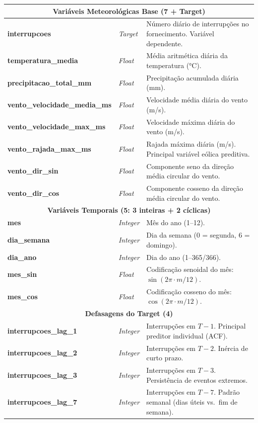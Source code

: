 \begin{center}
\begin{longtable}{p{6cm} p{1.2cm} p{5.8cm}}
\multicolumn{3}{c}{\textbf{Variáveis Meteorológicas Base (7 + Target)}} \\
\midrule
\textbf{interrupcoes} & \textit{Target} & Número diário de interrupções no fornecimento. Variável dependente. \\
\textbf{temperatura\_media} & \textit{Float} & Média aritmética diária da temperatura (°C). \\
\textbf{precipitacao\_total\_mm} & \textit{Float} & Precipitação acumulada diária (mm). \\
\textbf{vento\_velocidade\_media\_ms} & \textit{Float} & Velocidade média diária do vento (m/s). \\
\textbf{vento\_velocidade\_max\_ms} & \textit{Float} & Velocidade máxima diária do vento (m/s). \\
\textbf{vento\_rajada\_max\_ms} & \textit{Float} & Rajada máxima diária (m/s). Principal variável eólica preditiva. \\
\textbf{vento\_dir\_sin} & \textit{Float} & Componente seno da direção média circular do vento. \\
\textbf{vento\_dir\_cos} & \textit{Float} & Componente cosseno da direção média circular do vento. \\
\midrule
\multicolumn{3}{c}{\textbf{Variáveis Temporais (5: 3 inteiras + 2 cíclicas)}} \\
\midrule
\textbf{mes} & \textit{Integer} & Mês do ano (1--12). \\
\textbf{dia\_semana} & \textit{Integer} & Dia da semana (0 = segunda, 6 = domingo). \\
\textbf{dia\_ano} & \textit{Integer} & Dia do ano (1--365/366). \\
\textbf{mes\_sin} & \textit{Float} & Codificação senoidal do mês: $\sin(2\pi \cdot m/12)$. \\
\textbf{mes\_cos} & \textit{Float} & Codificação cosseno do mês: $\cos(2\pi \cdot m/12)$. \\
\midrule
\multicolumn{3}{c}{\textbf{Defasagens do Target (4)}} \\
\midrule
\textbf{interrupcoes\_lag\_1} & \textit{Integer} & Interrupções em $T-1$. Principal preditor individual (ACF). \\
\textbf{interrupcoes\_lag\_2} & \textit{Integer} & Interrupções em $T-2$. Inércia de curto prazo. \\
\textbf{interrupcoes\_lag\_3} & \textit{Integer} & Interrupções em $T-3$. Persistência de eventos extremos. \\
\textbf{interrupcoes\_lag\_7} & \textit{Integer} & Interrupções em $T-7$. Padrão semanal (dias úteis vs.\ fim de semana). \\

\end{longtable}
\end{center}

